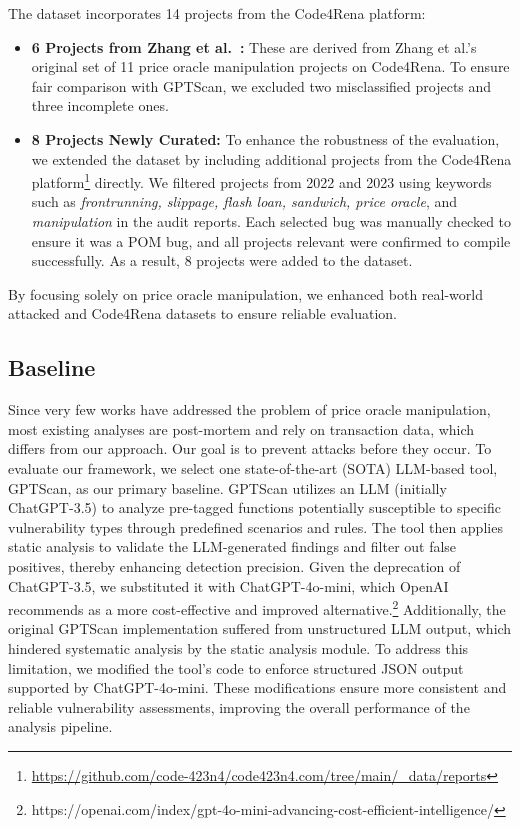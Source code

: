 The dataset incorporates 14 projects from the Code4Rena platform:
\begin{itemize}
\item \textbf{6 Projects from Zhang et al.~\cite{zhang2023demystifying}:} These are derived from Zhang et al.'s original set of 11 price oracle manipulation projects on Code4Rena. To ensure fair comparison with GPTScan, we excluded two misclassified projects and three incomplete ones.
\item \textbf{8 Projects Newly Curated:} To enhance the robustness of the evaluation, we extended the dataset by including additional projects from the Code4Rena platform\footnote{\url{https://github.com/code-423n4/code423n4.com/tree/main/\_data/reports}} directly. 
We filtered projects from 2022 and 2023 using keywords such as \textit{frontrunning, slippage, flash loan, sandwich, price oracle}, and \textit{manipulation} in the audit reports. 
Each selected bug was manually checked to ensure it was a POM bug, and all projects relevant were confirmed to compile successfully. 
As a result, 8 projects were added to the dataset.
\end{itemize}
By focusing solely on price oracle manipulation, we enhanced both real-world attacked and Code4Rena datasets to ensure reliable evaluation. 




\subsection{Baseline} \label{baseline}
Since very few works have addressed the problem of price oracle manipulation, most existing analyses are post-mortem and rely on transaction data, which differs from our approach. Our goal is to prevent attacks before they occur.
To evaluate our framework, we select one state-of-the-art (SOTA) LLM-based tool, GPTScan, as our primary baseline. GPTScan utilizes an LLM (initially ChatGPT-3.5) to analyze pre-tagged functions potentially susceptible to specific vulnerability types through predefined scenarios and rules. The tool then applies static analysis to validate the LLM-generated findings and filter out false positives, thereby enhancing detection precision.
Given the deprecation of ChatGPT-3.5, we substituted it with ChatGPT-4o-mini, which OpenAI recommends as a more cost-effective and improved alternative.\footnote{https://openai.com/index/gpt-4o-mini-advancing-cost-efficient-intelligence/}
Additionally, the original GPTScan implementation suffered from unstructured LLM output, which hindered systematic analysis by the static analysis module. To address this limitation, we modified the tool's code to enforce structured JSON output supported by ChatGPT-4o-mini. These modifications ensure more consistent and reliable vulnerability assessments, improving the overall performance of the analysis pipeline.

